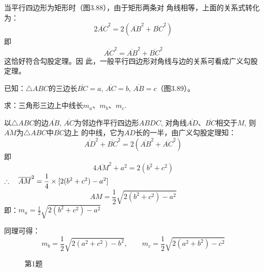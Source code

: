 当平行四边形为矩形时（图3.88），由于矩形两条对
角线相等，上面的关系式转化为：
\[2\overline{AC}^2=2\left(\overline{AB}^2+\overline{BC}^2\right)\]
即
\[\overline{AC}^2=\overline{AB}^2+\overline{BC}^2\]
这恰好符合勾股定理。因
此，一般平行四边形对角线与边的关系可看成广义勾股定理。
    
\begin{example}
    已知：$\triangle ABC$的三边长$\overline{BC}=a$, $\overline{AC}=b$, $\overline{AB}=c$（图3.89）。

求：三角形三边上中线长$m_a$、$m_b$、$m_c$.
\end{example}


\begin{solution}
    以$\triangle ABC$的边$\overline{AB}$, $\overline{AC}$为邻边作平行四边形$ABDC$, 
对角线$\overline{AD}$、$\overline{BC}$相交于$M$, 则$\overline{AM}$为$\triangle ABC$中$\overline{BC}$边上
的中线，它为$\overline{AD}$长的一半，由广义勾股定理知：
\[\overline{AD}^2+\overline{BC}^2=2\left(\overline{AB}^2+\overline{AC}^2\right)\]
即
\[4\overline{AM}^2+a^2=2(b^2+c^2)\]
$\therefore\quad \overline{AM}^2=\dfrac{1}{4}\times [2(b^2+c^2)-a^2]$
\[AM=\frac{1}{2}\sqrt{2(b^2+c^2)-a^2}\]
即：$m_a=\frac{1}{2}\sqrt{2(b^2+c^2)-a^2}$

同理可得：
\[m_b=\frac{1}{2}\sqrt{2(a^2+c^2)-b^2},\qquad m_c=\frac{1}{2}\sqrt{2(a^2+b^2)-c^2}\]
\end{solution}

\begin{figure}[htp]\centering
    \begin{minipage}[t]{0.48\textwidth}
    \centering
{}
    \caption{}
    \end{minipage}
    \begin{minipage}[t]{0.48\textwidth}
    \centering
    \caption*{第1题}
    \end{minipage}
    \end{figure}



